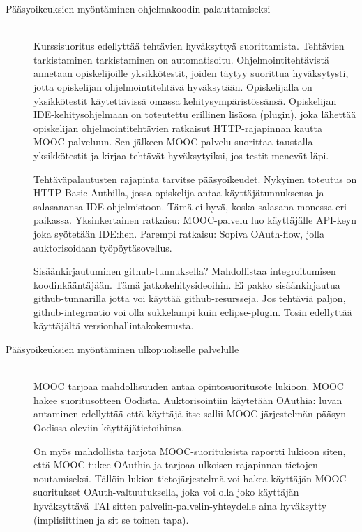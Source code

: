 \documentclass[finnish,gradu]{tktltiki}
\begin{document}
  \begin{description}
    \item[Pääsyoikeuksien myöntäminen ohjelmakoodin palauttamiseksi] \hfill \\
    Kurssisuoritus edellyttää tehtävien hyväksyttyä suorittamista. Tehtävien tarkistaminen tarkistaminen on automatisoitu. Ohjelmointitehtävistä annetaan opiskelijoille yksikkötestit, joiden täytyy suorittua hyväksytysti, jotta opiskelijan ohjelmointitehtävä hyväksytään. Opiskelijalla on yksikkötestit käytettävissä omassa kehitysympäristössänsä. Opiskelijan IDE-kehitysohjelmaan on toteutettu erillinen lisäosa (plugin), joka lähettää opiskelijan ohjelmointitehtävien ratkaisut HTTP-rajapinnan kautta MOOC-palveluun. Sen jälkeen MOOC-palvelu suorittaa taustalla yksikkötestit ja kirjaa tehtävät hyväksytyiksi, jos testit menevät läpi.

    Tehtäväpalautusten rajapinta tarvitse pääsyoikeudet. Nykyinen toteutus on HTTP Basic Authilla, jossa opiskelija antaa käyttäjätunnuksensa ja salasanansa IDE-ohjelmistoon. Tämä ei hyvä, koska salasana monessa eri paikassa. Yksinkertainen ratkaisu: MOOC-palvelu luo käyttäjälle API-keyn joka syötetään IDE:hen. Parempi ratkaisu: Sopiva OAuth-flow, jolla auktorisoidaan työpöytäsovellus.

    Sisäänkirjautuminen github-tunnuksella? Mahdollistaa integroitumisen koodinkääntäjään. Tämä jatkokehitysideoihin. Ei pakko sisäänkirjautua github-tunnarilla jotta voi käyttää github-resursseja. Jos tehtäviä paljon, github-integraatio voi olla sukkelampi kuin eclipse-plugin. Tosin edellyttää käyttäjältä versionhallintakokemusta.


  \item[Pääsyoikeuksien myöntäminen ulkopuoliselle palvelulle] \hfill \\
  MOOC tarjoaa mahdollisuuden antaa opintosuoritusote lukioon. MOOC hakee suoritusotteen Oodista. Auktorisointiin käytetään OAuthia: luvan antaminen edellyttää että käyttäjä itse sallii MOOC-järjestelmän pääsyn Oodissa oleviin käyttäjätietoihinsa.

  On myös mahdollista tarjota MOOC-suorituksista raportti lukioon siten, että MOOC tukee OAuthia ja tarjoaa ulkoisen rajapinnan tietojen noutamiseksi. Tällöin lukion tietojärjestelmä voi hakea käyttäjän MOOC-suoritukset OAuth-valtuutuksella, joka voi olla joko käyttäjän hyväksyttävä TAI sitten palvelin-palvelin-yhteydelle aina hyväksytty (implisiittinen ja sit se toinen tapa).


\end{description}
\end{document}
